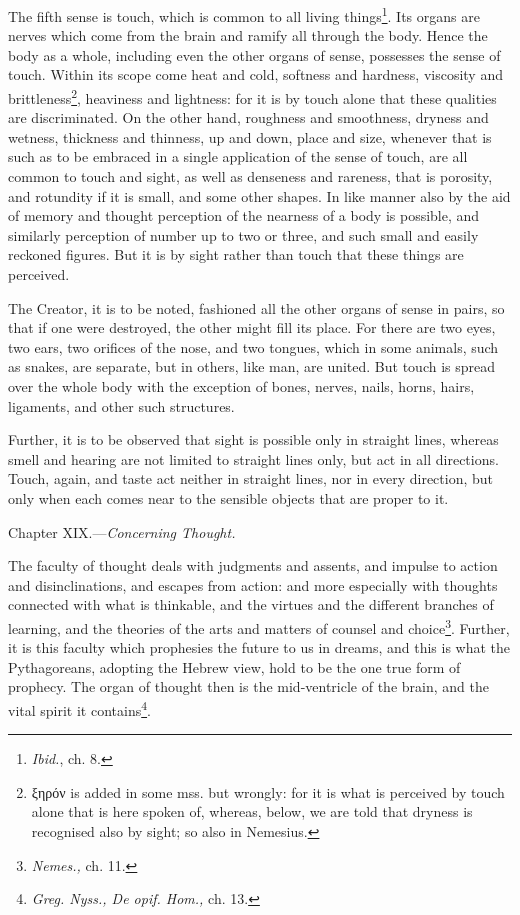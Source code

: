 The fifth sense is touch, which is common to all living things\footnote{\emph{Ibid.}, ch. 8.}. Its organs are nerves which come from the brain and ramify all through the body. Hence the body as a whole, including even the other organs of sense, possesses the sense of touch. Within its scope come heat and cold, softness and hardness, viscosity and brittleness\footnote{\textgreek{ξηρόν} is added in some mss. but wrongly: for it is what is perceived by touch alone that is here spoken of, whereas, below, we are told that dryness is recognised also by sight; so also in Nemesius.}, heaviness and lightness: for it is by touch alone that these qualities are discriminated. On the other hand, roughness and smoothness, dryness and wetness, thickness and thinness, up and down, place and size, whenever that is such as to be embraced in a single application of the sense of touch, are all common to touch and sight, as well as denseness and rareness, that is porosity, and rotundity if it is small, and some other shapes. In like manner also by the aid of memory and thought perception of the nearness of a body is possible, and similarly perception of number up to two or three, and such small and easily reckoned figures. But it is by sight rather than touch that these things are perceived.

The Creator, it is to be noted, fashioned all the other organs of sense in pairs, so that if one were destroyed, the other might fill its place. For there are two eyes, two ears, two orifices of the nose, and two tongues, which in some animals, such as snakes, are separate, but in others, like man, are united. But touch is spread over the whole body with the exception of bones, nerves, nails, horns, hairs, ligaments, and other such structures.

Further, it is to be observed that sight is possible only in straight lines, whereas smell and hearing are not limited to straight lines only, but act in all directions. Touch, again, and taste act neither in straight lines, nor in every direction, but only when each comes near to the sensible objects that are proper to it.


Chapter XIX.—\emph{Concerning Thought.}

The faculty of thought deals with judgments and assents, and impulse to action and disinclinations, and escapes from action: and more especially with thoughts connected with what is thinkable, and the virtues and the different branches of learning, and the theories of the arts and matters of counsel and choice\footnote{\emph{Nemes.,} ch. 11.}. Further, it is this faculty which prophesies the future to us in dreams, and this is what the Pythagoreans, adopting the Hebrew view, hold to be the one true form of prophecy. The organ of thought then is the mid-ventricle of the brain, and the vital spirit it contains\footnote{\emph{Greg. Nyss., De opif. Hom., }ch. 13.}.

